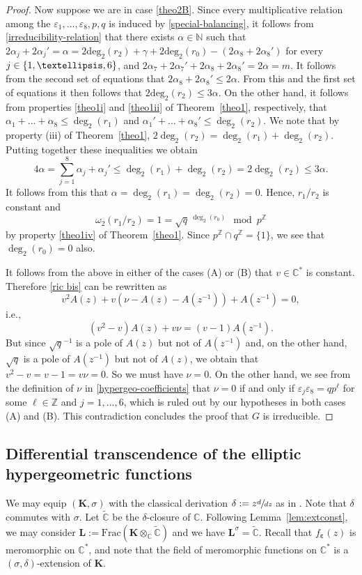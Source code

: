 \documentclass[11pt]{article}
\newcommand{\ie}{i.e.,\xspace}
\newcommand{\Subsection}{\subsection}
\numberwithin{equation}{section}\providecommand{\loccit}{\textit{loc.\ cit.}}
\theoremstyle{definition}
\newcommand{\N}{\mathbb N}
\newcommand{\Z}{\mathbb Z}
\newcommand{\C}{\mathbb C}
\newcommand\K{\boldsymbol{K}}
\renewcommand\L{\boldsymbol{L}}
\let\d\delta
\let\s\sigma
\newcommand{\degr}[1]{\deg_{#1}}
\newcommand{\subeps}{\boldsymbol{\varepsilon}}
\begin{document}
\begin{proof}
Now suppose we are in case \eqref{theo2B}. Since every multiplicative relation among the $\varepsilon_{1},\dots,\varepsilon_{8},p,q$ is induced by \eqref{special-balancing}, it follows from \eqref{irreducibility-relation} that there exists $\alpha\in\N$ such that $2\alpha_j+2\alpha_j'=\alpha=2\mathrm{deg}_2(r_2)+\gamma+2\mathrm{deg}_2(r_0)-(2\alpha_8+2\alpha_8')$ for every $j\in\nobreak\{1,\dots,6\}$, and $2\alpha_7+2\alpha_7'+2\alpha_8+2\alpha_8'=2\alpha=m$. It follows from the second set of equations that $2\alpha_8+2\alpha_8'\leq 2\alpha$. From this and the first set of equations it then follows that $2\mathrm{deg}_2(r_2)\leq 3\alpha$. On the other hand, it follows from properties \eqref{theo1i} and \eqref{theo1ii} of Theorem~\ref{theo1}, respectively, that $\alpha_1+\dots+\alpha_8\leq\degr{2}(r_1)$ and $\alpha_1'+\dots+\alpha_8'\leq\degr{2}(r_2)$. We note that by property (iii) of Theorem~\ref{theo1}, $2\degr{2}(r_2)=\degr{2}(r_1)+\degr{2}(r_2)$. Putting together these inequalities we obtain
\[
4\alpha=\sum_{j=1}^8\alpha_j+\alpha_j'\leq\degr{2}(r_1)+\degr{2}(r_2)=2\degr{2}(r_2)\leq 3\alpha.
\]
It follows from this that $\alpha=\degr{2}(r_1)=\degr{2}(r_2)=0$. Hence, $r_1/r_2$ is constant and
\[
\omega_2(r_1/r_2)=1=\sqrt{q}\,^{\degr{2}(r_0)} \mod p^\Z
\]
by property \eqref{theo1iv} of Theorem~\ref{theo1}. Since $p^\Z\cap q^\Z=\{1\}$, we see that ${\degr{2}(r_0)=0}$ also.

It follows from the above in either of the cases (A) or (B) that $v\in \C^{*}$ is constant. Therefore \eqref{ric bis} can be rewritten as
\begin{equation}\label{eq1}
v^{2}A(z)+v(\nu-A(z)-A(z^{-1}))+A(z^{-1})=0,
\end{equation}
\ie
\begin{equation}\label{eq1bis}
(v^{2}-v)A(z)+v\nu=(v-1)A(z^{-1}).
\end{equation}
But since $\sqrt{q}^{-1}$ is a pole of $A(z)$ but not of $A(z^{-1})$ and, on the other hand, $\sqrt{q}$ is a pole of $A(z^{-1})$ but not of $A(z)$, we obtain that $v^{2}-v=v-1=v\nu=0$. So we must have $\nu=0$. On the other hand, we see from the definition of $\nu$ in \eqref{hypergeo-coefficients} that $\nu=0$ if and only if $\varepsilon_j\varepsilon_8=qp^\ell$ for some $\ell\in\mathbb{Z}$ and $j=1,\dots,6$, which is ruled out by our hypotheses in both cases (A) and (B).
This contradiction concludes the proof that $G$ is irreducible.
\end{proof}

\Subsection{Differential transcendence of the elliptic hypergeometric functions}
We may equip $(\K,\s)$ with the classical derivation $\d:=z\sfrac{d}{dz}$ as in \cite[\S 3.1]{dreyfus2018nature}. Note that $\d$ commutes with $\s$. Let $\widetilde{\C}$ be the $\d$-closure of $\C$. Following Lemma~\ref{lem:extconst}, we may consider $\L:=\mathrm{Frac} (\K\otimes_{\C}\widetilde{\C})$ and we have $\L^{\s}= \widetilde{\C}$. Recall that $f_{\subeps}(z)$ is meromorphic on $\C^{*}$, and note that the field of meromorphic functions on $\C^*$ is a $(\sigma,\delta)$-extension of $\K$.
\end{document}
